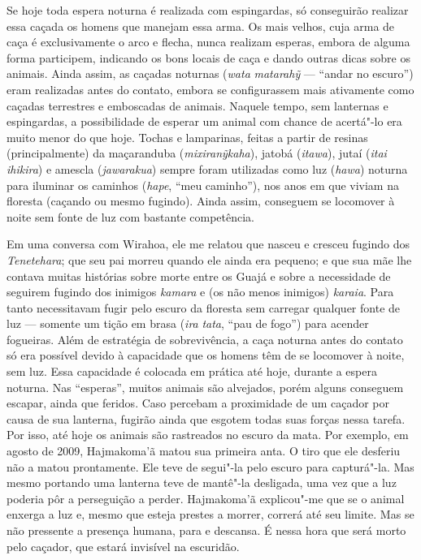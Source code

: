 Se hoje toda espera noturna é realizada com espingardas, só conseguirão
realizar essa caçada os homens que manejam essa arma. Os mais velhos,
cuja arma de caça é exclusivamente o arco e flecha, nunca realizam
esperas, embora de alguma forma participem, indicando os bons locais de
caça e dando outras dicas sobre os animais. Ainda assim, as caçadas
noturnas (\emph{wata} \emph{matarahỹ} --- ``andar no escuro'') eram
realizadas antes do contato, embora se configurassem mais ativamente
como caçadas terrestres e emboscadas de animais. Naquele tempo, sem
lanternas e espingardas, a possibilidade de esperar um animal com chance
de acertá"-lo era muito menor do que hoje. Tochas e lamparinas, feitas a
partir de resinas (principalmente) da maçaranduba (\emph{mixiranỹkaha}),
jatobá (\emph{itawa}), jutaí (\emph{itai ihikira}) e amescla
(\emph{jawarakua}) sempre foram utilizadas como luz (\emph{hawa})
noturna para iluminar os caminhos (\emph{hape}, ``meu caminho''), nos anos
em que viviam na floresta (caçando ou mesmo fugindo). Ainda assim,
conseguem se locomover à noite sem fonte de luz com bastante
competência.

Em uma conversa com Wirahoa, ele me relatou que nasceu e cresceu fugindo
dos \emph{Tenetehara}; que seu pai morreu quando ele ainda era pequeno;
e que sua mãe lhe contava muitas histórias sobre morte entre os Guajá e
sobre a necessidade de seguirem fugindo dos inimigos \emph{kamara} e (os
não menos inimigos) \emph{karaia}. Para tanto necessitavam fugir pelo
escuro da floresta sem carregar qualquer fonte de luz --- somente um tição
em brasa (\emph{ira} \emph{tata}, ``pau de fogo'') para acender fogueiras.
Além de estratégia de sobrevivência, a caça noturna antes do contato só
era possível devido à capacidade que os homens têm de se locomover à
noite, sem luz. Essa capacidade é colocada em prática até hoje, durante
a espera noturna. Nas ``esperas'', muitos animais são alvejados, porém
alguns conseguem escapar, ainda que feridos. Caso percebam a proximidade
de um caçador por causa de sua lanterna, fugirão ainda que esgotem todas
suas forças nessa tarefa. Por isso, até hoje os animais são rastreados
no escuro da mata. Por exemplo, em agosto de 2009, Hajmakoma'ã matou sua
primeira anta. O tiro que ele desferiu não a matou prontamente. Ele teve
de segui"-la pelo escuro para capturá"-la. Mas mesmo portando uma lanterna
teve de mantê"-la desligada, uma vez que a luz poderia pôr a perseguição
a perder. Hajmakoma'ã explicou"-me que se o animal enxerga a luz e, mesmo
que esteja prestes a morrer, correrá até seu limite. Mas se não
pressente a presença humana, para e descansa. É nessa hora que será
morto pelo caçador, que estará invisível na escuridão.

